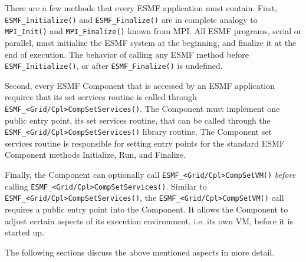 %

\begin{sloppypar}
There are a few methods that every ESMF application must contain. First,
{\tt ESMF\_Initialize()} and {\tt ESMF\_Finalize()} are in complete analogy 
to {\tt MPI\_Init()} and {\tt MPI\_Finalize()} known from MPI. All ESMF
programs, serial or parallel, must initialize the ESMF system at the beginning,
and finalize it at the end of execution. The behavior of calling any
ESMF method before {\tt ESMF\_Initialize()}, or after {\tt ESMF\_Finalize()}
is undefined.
\end{sloppypar}

Second, every ESMF Component that is accessed by an ESMF application requires
that its set services routine is called through
{\tt ESMF\_<Grid/Cpl>CompSetServices()}. The Component must implement
one public entry point, its set services routine, that can be called
through the {\tt ESMF\_<Grid/Cpl>CompSetServices()} library routine. The
Component set services routine is responsible for setting entry points
for the standard ESMF Component methods Initialize, Run, and Finalize.

\begin{sloppypar}
Finally, the Component can optionally call {\tt ESMF\_<Grid/Cpl>CompSetVM()}
{\em before} calling
{\tt ESMF\_<Grid/Cpl>CompSetServices()}. Similar to 
{\tt ESMF\_<Grid/Cpl>CompSetServices()}, the 
{\tt ESMF\_<Grid/Cpl>CompSetVM()}
call requires a public entry point into the Component. It allows the Component
to adjust certain aspects of its execution environment, i.e. its own VM, before
it is started up.
\end{sloppypar}

The following sections discuss the above mentioned aspects in more detail.
